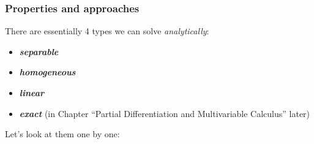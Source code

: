 \documentclass[12pt]{report}
\theoremstyle{definition}
\begin{document}
\subsubsection{Properties and approaches}

There are essentially 4 types we can solve \emph{analytically}:
\begin{itemize}
        \item \emph{\textbf{separable}} 
        \item \emph{\textbf{homogeneous}} 
        \item \emph{\textbf{linear}} 
        \item \emph{\textbf{exact}} (in Chapter ``Partial Differentiation and Multivariable Calculus'' later)
\end{itemize}

Let's look at them one by one:
\end{document}
